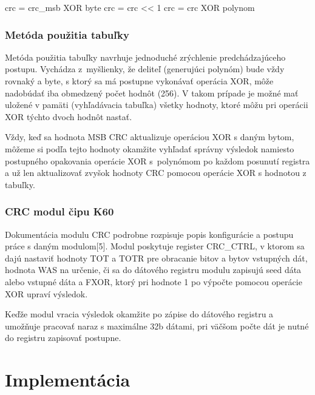 \documentclass[11pt,a4paper]{article}
\begin{document}
\begin{algorithm}[H]

 {
	crc = crc\_msb XOR byte\;
	 {	
		crc = crc << 1\;
		 {
			crc = crc XOR polynom\;
		}
	}
}
\end{algorithm}

\subsubsection{Metóda použitia tabuľky}

Metóda použitia tabuľky navrhuje jednoduché zrýchlenie predchádzajúceho postupu. Vychádza z~myšlienky, že deliteľ (generujúci polynóm) bude vždy rovnaký a byte, s ktorý sa má postupne vykonávať operácia XOR, môže nadobúdať iba obmedzený počet hodnôt (256). V takom prípade je možné mať uložené v pamäti (vyhľadávacia tabuľka) všetky hodnoty, ktoré môžu pri operácii XOR týchto dvoch hodnôt nastať. 

Vždy, keď sa hodnota MSB CRC aktualizuje operáciou XOR s daným bytom, môžeme si podľa tejto hodnoty okamžite vyhľadať správny výsledok namiesto postupného opakovania operácie XOR s~polynómom po každom posunutí registra a už len aktualizovať zvyšok hodnoty CRC pomocou operácie XOR s hodnotou z tabuľky.

\subsubsection{CRC modul čipu K60}

Dokumentácia modulu CRC podrobne rozpisuje popis konfigurácie a postupu práce s daným modulom[5].
Modul poskytuje register CRC\_CTRL, v ktorom sa dajú nastaviť hodnoty TOT a TOTR pre obracanie bitov a bytov vstupných dát, hodnota WAS na určenie, či sa do dátového registru modulu zapisujú seed dáta alebo vstupné dáta a FXOR, ktorý pri hodnote 1 po výpočte pomocou operácie XOR upraví výsledok. 

Keďže modul vracia výsledok okamžite po zápise do dátového registru a umožňuje pracovať naraz s maximálne 32b dátami, pri väčšom počte dát je nutné do registru zapisovať postupne.


\section{Implementácia} \label{implementacia}
\end{document}

